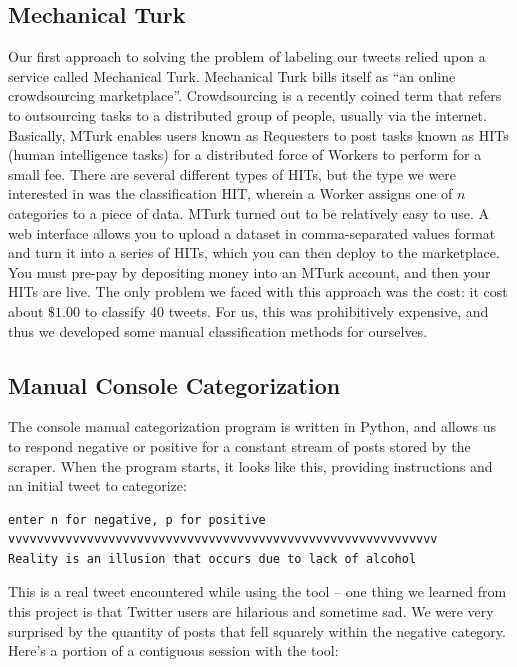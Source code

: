 \documentclass[12pt,a4paper]{article}
\begin{document}
\subsection { Mechanical Turk }

Our first approach to solving the problem of labeling our tweets relied upon a service called Mechanical Turk. Mechanical Turk bills itself as ``an online crowdsourcing marketplace''. Crowdsourcing is a recently coined term that refers to outsourcing tasks to a distributed group of people, usually via the internet. Basically, MTurk enables users known as Requesters to post tasks known as HITs (human intelligence tasks) for a distributed force of Workers to perform for a small fee. There are several different types of HITs, but the type we were interested in was the classification HIT, wherein a Worker assigns one of $n$ categories to a piece of data. MTurk turned out to be relatively easy to use. A web interface allows you to upload a dataset in comma-separated values format and turn it into a series of HITs, which you can then deploy to the marketplace. You must pre-pay by depositing money into an MTurk account, and then your HITs are live. The only problem we faced with this approach was the cost: it cost about $\$1.00$ to classify 40 tweets. For us, this was prohibitively expensive, and thus we developed some manual classification methods for ourselves.

\subsection { Manual Console Categorization }

The console manual categorization program is written in Python, and allows us to respond negative or positive for a constant stream of posts stored by the scraper.  When the program starts, it looks like this, providing instructions and an initial tweet to categorize:

\begin{verbatim}
enter n for negative, p for positive
vvvvvvvvvvvvvvvvvvvvvvvvvvvvvvvvvvvvvvvvvvvvvvvvvvvvvvvvvvvv
Reality is an illusion that occurs due to lack of alcohol
\end{verbatim}

This is a real tweet encountered while using the tool -- one thing we learned from this project is that Twitter users are hilarious and sometime sad.  We were very surprised by the quantity of posts that fell squarely within the negative category.  Here's a portion of a contiguous session with the tool:
\end{document}
